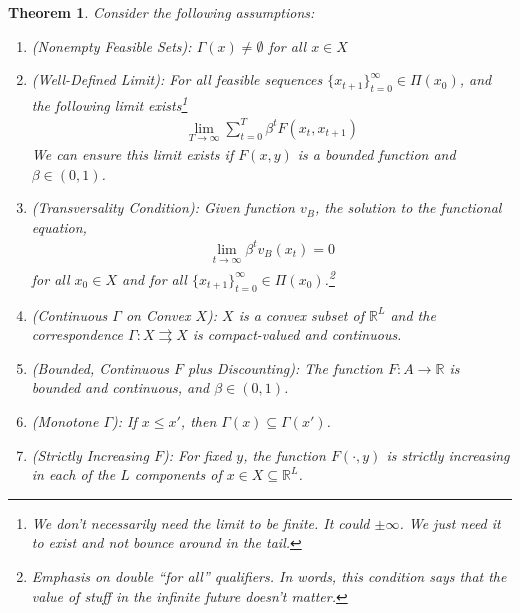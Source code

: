 \documentclass[12pt]{article}
\numberwithin{equation}{section} %
\theoremstyle{plain}
\newtheorem{thm}{Theorem}[section]
\theoremstyle{definition}
\theoremstyle{remark}
\newcommand{\ra}{\rightarrow}
\newcommand{\R}{\mathbb{R}}
\begin{document}
\clearpage
\begin{thm}
\label{thm:vstar-solves-bellman}
Consider the following assumptions:
\begin{enumerate}
  \item \emph{(Nonempty Feasible Sets)}:
    $\Gamma(x)\neq\emptyset$ for all $x\in X$

  \item \emph{(Well-Defined Limit)}:
    For all feasible sequences $\{x_{t+1}\}_{t=0}^\infty \in \Pi(x_0)$,
    and the following limit exists\footnote{%
      We don't necessarily need the limit to be \emph{finite}. It could
      $\pm \infty$. We just need it to exist and not bounce around in
      the tail.
    }
    \begin{align*}
      \lim_{T\rightarrow\infty} \sum_{t=0}^T \beta^t F(x_t,x_{t+1})
    \end{align*}
    We can ensure this limit exists if $F(x,y)$ is a bounded function
    and $\beta \in (0,1)$.

  \item \emph{(Transversality Condition)}:
    Given function $v_B$, the solution to the functional equation,
    \begin{align*}
      \lim_{t\rightarrow\infty} \beta^t v_B(x_t) = 0
    \end{align*}
    for all $x_0\in X$ and for all
    $\{x_{t+1}\}_{t=0}^\infty \in \Pi(x_0)$.\footnote{%
    Emphasis on double ``for all'' qualifiers.
    In words, this condition says that the value of stuff in the
    infinite future doesn't matter.}

  \item
    \emph{(Continuous $\Gamma$ on Convex $X$)}:
    $X$ is a convex subset of $\R^L$ and the correspondence
    $\Gamma:X\rightrightarrows X$ is compact-valued and continuous.

  \item
    \emph{(Bounded, Continuous $F$ plus Discounting)}:
    The function $F:A\ra \R$ is bounded and continuous, and
    $\beta\in (0,1)$.

  \item
    \emph{(Monotone $\Gamma$)}:
    If $x \leq x'$, then $\Gamma(x) \subseteq \Gamma(x')$.

  \item
    \emph{(Strictly Increasing $F$)}:
    For fixed $y$, the function $F(\cdot,y)$ is strictly increasing in
    each of the $L$ components of $x\in X\subseteq \R^L$.


\end{enumerate}
\end{thm}
\end{document}
